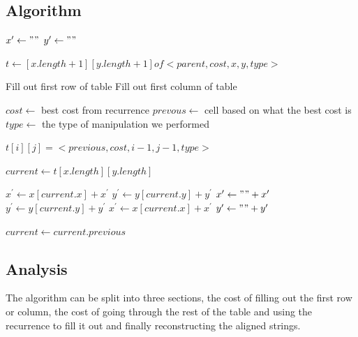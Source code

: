 \documentclass{article}
\begin{document}
				\subsection{Algorithm}
					\begin{algorithm}
						\begin{algorithmic}[1]
								\State $x^\prime \gets ""$
								\State $y^\prime \gets ""$
								
								\State $t \gets [x.length + 1][y.length + 1] of <parent, cost, x, y, type>$
								
								\State Fill out first row of table
								\State Fill out first column of table
								
										\State $cost \gets $ best cost from recurrence 
										\State $prevous \gets$ cell based on what the best cost is 
										\State $type \gets$ the type of manipulation we performed
										
										\State $t[i][j] = <previous, cost, i-1, j-1, type>$
									\EndFor
								\EndFor
								
								\State $current \gets t[x.length][y.length]$\newline
								
										\State $x^\prime \gets x[current.x] + x^\prime$
										\State $y^\prime \gets y[current.y] + y^\prime$
										\State $x^\prime \gets " " + x^\prime$
										\State $y^\prime \gets y[current.y] + y^\prime$
										\State $x^\prime \gets x[current.x] + x^\prime$
										\State $y^\prime \gets " " + y^\prime$
									\EndIf
									
									\State $current \gets current.previous$
								\EndWhile								
								
							\EndProcedure
						\end{algorithmic}
					\end{algorithm}
					
					\break
				
				\subsection{Analysis}
					The algorithm can be split into three sections, the cost of filling out the first row or column, the cost of going through the rest of the table and using the recurrence to fill it out and finally reconstructing the aligned strings.
					
\end{document}
